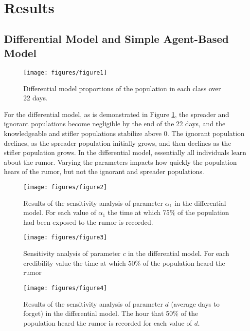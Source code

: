 \section{Results }
\label{sec:results}

\subsection{Differential Model and Simple Agent-Based Model}
\label{subsec:basicmod}

\begin{figure}[H]
\captionsetup{width=0.6\textwidth}
\centering
    \texttt{[image: figures/figure1]}
  \caption{ Differential model proportions of the population in each class over 22 days. }
  \label{fig:figure1}
\end{figure}

For the differential model, as is demonstrated in Figure \ref{fig:figure1}, the spreader and ignorant populations become negligible by the end of the 22 days, and the knowledgeable and stifler populations stabilize above 0. The ignorant population declines, as the spreader population initially grows, and then declines as the stifler population grows. In the differential model, essentially all individuals learn about the rumor. Varying the parameters impacts how quickly the population hears of the rumor, but not the ignorant and spreader populations.

\begin{figure}[H]
\captionsetup{width=0.8\textwidth}
\centering
    \texttt{[image: figures/figure2]}
  \caption{ Results of the sensitivity analysis of parameter $ \alpha_1 $ in the differential model. For each value of $ \alpha_1 $ the time at which 75\% of the population had been exposed to the rumor is recorded. }
  \label{fig:figure2}
\end{figure}

\begin{figure}[H]
\captionsetup{width=0.8\textwidth}
\centering
    \texttt{[image: figures/figure3]}
  \caption{ Sensitivity analysis of parameter $ c $ in the differential model. For each credibility value the time at which 50\% of the population heard the rumor }
  \label{fig:figure3}
\end{figure}

\begin{figure}[H]
\captionsetup{width=0.8\textwidth}
\centering
    \texttt{[image: figures/figure4]}
  \caption{Results of the sensitivity analysis of parameter $ d $ (average days to forget) in the differential model. The hour that 50\% of the population heard the rumor is recorded for each value of $ d $.}
  \label{fig:figure4}
\end{figure}


